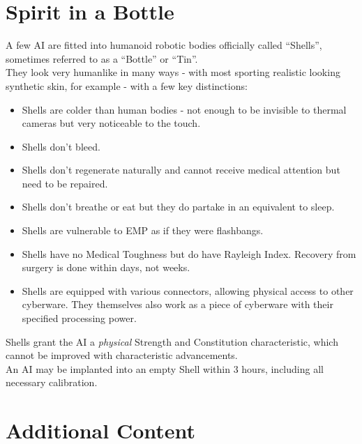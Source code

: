 \documentclass[12pt,a4paper,openany]{book}
\begin{document}
	\chapter{Spirit in a Bottle}
	A few AI are fitted into humanoid robotic bodies officially called “Shells”, sometimes referred to as a “Bottle” or “Tin”.
	\\%
	They look very humanlike in many ways - with most sporting realistic looking synthetic skin, for example - with a few key distinctions:
	\vspace{-8mm}
	\begin{itemize}
		\setlength\itemsep{-8mm}
		\item Shells are colder than human bodies - not enough to be invisible to thermal cameras but very noticeable to the touch.
		\item Shells don’t bleed.
		\item Shells don’t regenerate naturally and cannot receive medical attention but need to be repaired.
		\item Shells don’t breathe or eat but they do partake in an equivalent to sleep.
		\item Shells are vulnerable to EMP as if they were flashbangs.
		\item Shells have no Medical Toughness but do have Rayleigh Index. Recovery from surgery is done within days, not weeks.
		\item Shells are equipped with various connectors, allowing physical access to other cyberware. They themselves also work as a piece of cyberware with their specified processing power.
	\end{itemize}
	\par
	Shells grant the AI a \emph{physical} Strength and Constitution characteristic, which cannot be improved with characteristic advancements.
	\\%
	An AI may be implanted into an empty Shell within 3 hours, including all necessary calibration.

	\chapter{Additional Content}
	\vspace{-18mm}
\end{document}
